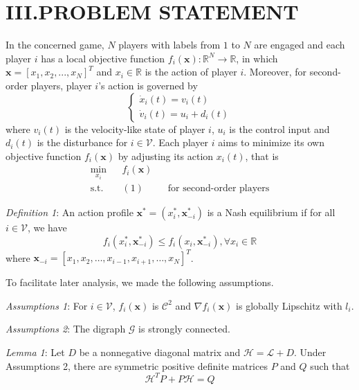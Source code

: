 \documentclass[12pt, a4paper, oneside]{ctexbook}
\begin{document}
\section*{III.\quad PROBLEM STATEMENT}
In the concerned game, $N$ players with labels from $1$ to $N$ are engaged and each player $i$ has a local objective function $f_i(\mathbf{x}):\mathbb{R}^N \rightarrow \mathbb{R}$, in which $\mathbf{x} = [x_1,x_2,...,x_N]^T$ and $x_i \in \mathbb{R}$ is the action of player $i$. Moreover, for second-order players, player $i$'s action is governed by 
\begin{equation}
    \begin{cases}
        \dot{x}_i(t)=v_i(t)\\
        \dot{v}_i(t)=u_i+d_i(t)
    \end{cases}
\end{equation}
where $v_i(t)$ is the velocity-like state of player $i$, $u_i$ is the control input and $d_i(t)$ is the disturbance for $i \in \mathcal{V}$. Each player $i$ aims to minimize its own objective function $f_i(\mathbf{x})$ by adjusting its action $x_i(t)$, that is
\begin{equation}
    \begin{aligned}
        \min_{x_i}&&f_i(\mathbf{x})\\
        \text{s.t.}&&(1)&&\text{for second-order players}
    \end{aligned}
\end{equation}

\emph{Definition 1}: An action profile $\mathbf{x}^{*}=(x_{i}^{*},\mathbf{x}_{-i}^{*})$ is a Nash equilibrium if for all $i \in \mathcal{V}$, we have
\begin{equation}
    f_i(x_i^*,\mathbf{x}_{-i}^*)\leq f_i(x_i,\mathbf{x}_{-i}^*),\forall x_i\in\mathbb{R}
\end{equation}
where $\mathbf{x}_{-i}=[x_{1},x_{2},\ldots,x_{i-1},x_{i+1},\ldots,x_{N}]^{T}$.

To facilitate later analysis, we made the following assumptions.

\emph{Assumptions 1}: For $i \in \mathcal{V}$, $f_i(\mathbf{x})$ is $\mathcal{C}^2$ and $\nabla f_i(\mathbf{x})$ is globally Lipschitz with $l_i$.

\emph{Assumptions 2}: The digraph $\mathcal{G}$ is strongly connected.

\emph{Lemma 1}: Let $D$ be a nonnegative diagonal matrix and $\mathcal{H} = \mathcal{L} + D$. Under Assumptions 2, there are symmetric positive definite matrices $P$ and $Q$ such that
\begin{equation}
        \mathcal{H}^{T}P+P\mathcal{H}=Q
\end{equation}
\end{document}
